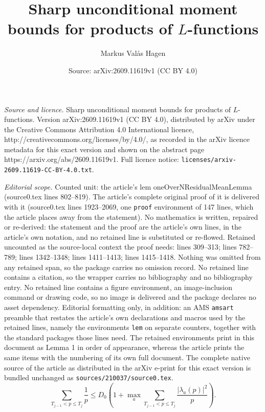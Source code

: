 \documentclass[10pt,a4paper]{amsart}
\title{Sharp unconditional moment bounds for products of $L$-functions}
\author{Markus Val{\aa}s Hagen}
\date{Source: arXiv:2609.11619v1 (CC BY 4.0)}
\begin{document}
\maketitle

\noindent\emph{Source and licence.} Sharp unconditional moment bounds for products of $L$-functions. Version arXiv:2609.11619v1 (CC BY 4.0), distributed by arXiv under the Creative Commons Attribution 4.0 International licence, http://creativecommons.org/licenses/by/4.0/, as recorded in the arXiv licence metadata for this exact version and shown on the abstract page https://arxiv.org/abs/2609.11619v1. Full licence notice: \texttt{licenses/arxiv-2609.11619-CC-BY-4.0.txt}.\par\smallskip

\noindent\textit{Editorial scope.} Counted unit: the article's lem oneOverNResidualMeanLemma (source0.tex lines 802--819). The article's complete original proof of it is delivered with it (source0.tex lines 1923--2069, one \texttt{proof} environment of 147 lines, which the article places away from the statement). No mathematics is written, repaired or re-derived: the statement and the proof are the article's own lines, in the article's own notation, and no retained line is substituted or re-flowed.  Retained uncounted as the source-local context the proof needs: lines 309--313; lines 782--789; lines 1342--1348; lines 1411--1413; lines 1415--1418.  Nothing was omitted from any retained span, so the package carries no omission record.  No retained line contains a citation, so the wrapper carries no bibliography and no bibliography entry.  No retained line contains a figure environment, an image-inclusion command or drawing code, so no image is delivered and the package declares no asset dependency.  Editorial formatting only, in addition: an AMS \texttt{amsart} preamble that restates the article's own declarations and macros used by the retained lines, namely the environments \texttt{lem} on separate counters, together with the standard packages those lines need.  The retained environments print in this document as Lemma 1 in order of appearance, whereas the article prints the same items with the numbering of its own full document.  The complete native source of the article as distributed in the arXiv e-print for this exact version is bundled unchanged as \texttt{sources/210037/source0.tex}.
		\begin{equation}\label{unweightedVarianceComparison}
			\sum_{T_{j-1}<p\leq T_j}\frac1p
			\leq D_0\left(1+\max_a
			\sum_{T_{j-1}<p\leq T_j}\frac{|\lambda_a(p)|^2}{p}\right).
		\end{equation}
\end{document}
